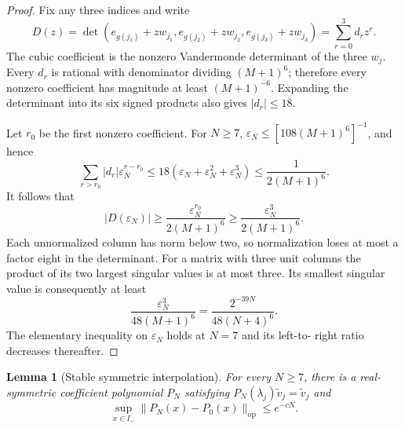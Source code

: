 \documentclass[11pt]{article}
\newtheorem{lemma}[theorem]{Lemma}
\theoremstyle{remark}
\newcommand{\op}{\mathrm{op}}
\begin{document}
\begin{proof}
Fix any three indices and write
\[
 D(z)=\det(e_{g(j_1)}+zw_{j_1},e_{g(j_2)}+zw_{j_2},
                 e_{g(j_3)}+zw_{j_3})=\sum_{r=0}^3d_rz^r.
\]
The cubic coefficient is the nonzero Vandermonde determinant of the three
$w_j$.  Every $d_r$ is rational with denominator dividing $(M+1)^6$;
therefore every nonzero coefficient has magnitude at least $(M+1)^{-6}$.
Expanding the determinant into its six signed products also gives
$|d_r|\le18$.

Let $r_0$ be the first nonzero coefficient.  For $N\ge7$,
$\varepsilon_N\le[108(M+1)^6]^{-1}$, and hence
\[
 \sum_{r>r_0}|d_r|\varepsilon_N^{r-r_0}
 \le18(\varepsilon_N+\varepsilon_N^2+\varepsilon_N^3)
 \le\frac1{2(M+1)^6}.
\]
It follows that
\[
 |D(\varepsilon_N)|
 \ge\frac{\varepsilon_N^{r_0}}{2(M+1)^6}
 \ge\frac{\varepsilon_N^3}{2(M+1)^6}.
\]
Each unnormalized column has norm below two, so normalization loses at most a
factor eight in the determinant.  For a matrix with three unit columns the
product of its two largest singular values is at most three.  Its smallest
singular value is consequently at least
\[
 \frac{\varepsilon_N^3}{48(M+1)^6}
 =\frac{2^{-39N}}{48(N+4)^6}.
\]
The elementary inequality on $\varepsilon_N$ holds at $N=7$ and its left-to-
right ratio decreases thereafter.
\end{proof}

\begin{lemma}[Stable symmetric interpolation]\label{lem:stability}
For every $N\ge7$, there is a real-symmetric coefficient polynomial $P_N$
satisfying $P_N(\lambda_j)\widetilde v_j=\widetilde v_j$ and
\[
 \sup_{x\in I_-}\|P_N(x)-P_0(x)\|_{\op}
 \le e^{-cN}.
\]
\end{lemma}
\end{document}

